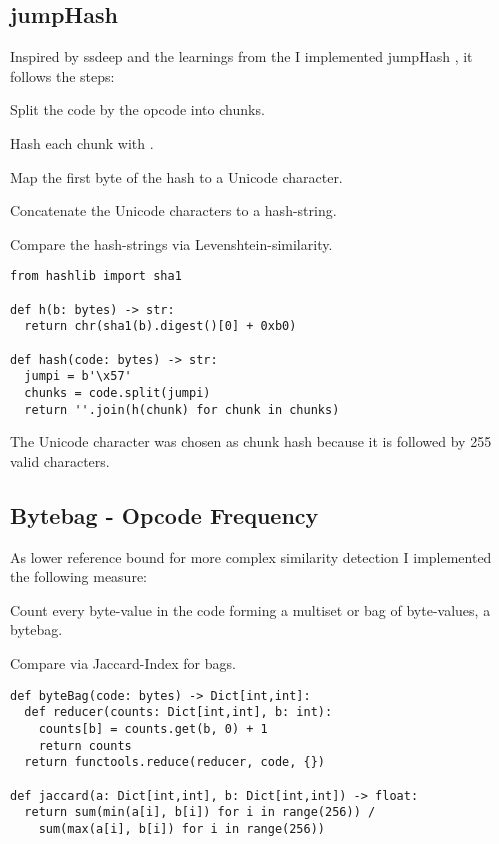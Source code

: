 \documentclass[../main.tex]{subfiles}
\begin{document}
\subsection{jumpHash}
Inspired by ssdeep and the learnings from the  I implemented jumpHash \cite{ethereum-contract-similarity}, it follows the steps:
\begin{ol}
  \item Split the code by the opcode  into chunks.
  \item Hash each chunk with .
  \item Map the first byte of the  hash to a Unicode character.
  \item Concatenate the Unicode characters to a hash-string.
  \item Compare the hash-strings via Levenshtein-similarity.
\end{ol}
\begin{lstlisting}[style=pymd]
from hashlib import sha1

def h(b: bytes) -> str:
  return chr(sha1(b).digest()[0] + 0xb0)

def hash(code: bytes) -> str:
  jumpi = b'\x57'
  chunks = code.split(jumpi)
  return ''.join(h(chunk) for chunk in chunks)
\end{lstlisting}
The Unicode character  was chosen as  chunk hash because it is followed by 255 valid characters.

\subsection{Bytebag - Opcode Frequency}
As lower reference bound for more complex similarity detection I implemented the following measure:

\begin{ol}
  \item Count every byte-value in the code forming a multiset or bag of byte-values, a bytebag.
  \item Compare via Jaccard-Index for bags.
\end{ol}

\begin{lstlisting}[style=pymd]
def byteBag(code: bytes) -> Dict[int,int]:
  def reducer(counts: Dict[int,int], b: int):
    counts[b] = counts.get(b, 0) + 1
    return counts
  return functools.reduce(reducer, code, {})

def jaccard(a: Dict[int,int], b: Dict[int,int]) -> float:
  return sum(min(a[i], b[i]) for i in range(256)) /
    sum(max(a[i], b[i]) for i in range(256))
\end{lstlisting}
\end{document}
